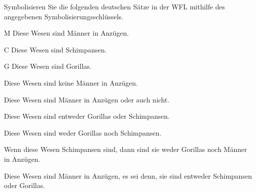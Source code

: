 \practiceproblems
\problempart 
Symbolisieren Sie die folgenden deutschen Sätze in der WFL mithilfe des angegebenen Symbolisierungsschlüssels.\label{pr.monkeysuits}
	\begin{ekey}
		\item[M] Diese Wesen sind Männer in Anzügen. 
		\item[C] Diese Wesen sind Schimpansen. 
		\item[G] Diese Wesen sind Gorillas.
	\end{ekey}
\begin{earg}
\item Diese Wesen sind keine Männer in Anzügen.
\item Diese Wesen sind Männer in Anzügen oder auch nicht.
\item Diese Wesen sind entweder Gorillas oder Schimpansen.
\item Diese Wesen sind weder Gorillas noch Schimpansen.
\item Wenn diese Wesen Schimpansen sind, dann sind sie weder Gorillas noch Männer in Anzügen.
\item Diese Wesen sind Männer in Anzügen, es sei denn, sie sind entweder Schimpansen oder Gorillas.
\end{earg}

